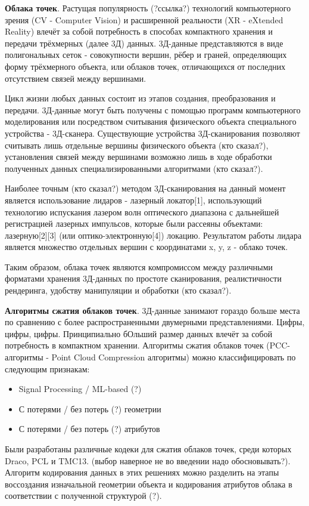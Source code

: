 \textbf{Облака точек}. Растущая популярность (?ссылка?) технологий компьютерного
зрения (CV - Computer Vision) и расширенной реальности (XR - eXtended Reality)
влечёт за собой потребность в способах компактного хранения и передачи
трёхмерных (далее 3Д) данных. 3Д-данные представляются в виде полигональных
сеток - совокупности вершин, рёбер и граней, определяющих форму трёхмерного
объекта, или облаков точек, отличающихся от последних отсутствием связей между
вершинами.

Цикл жизни любых данных состоит из этапов создания, преобразования и передачи.
3Д-данные могут быть получены с помощью программ компьютерного моделирования или
посредством считывания физического объекта специального устройства - 3Д-сканера.
Существующие устройства 3Д-сканирования позволяют считывать лишь отдельные
вершины физического объекта (кто сказал?), установления связей между вершинами
возможно лишь в ходе обработки полученных данных специализированными алгоритмами
(кто сказал?).

Наиболее точным (кто сказал?) методом 3Д-сканирования на данный момент является
использование лидаров - лазерный локатор[1], использующий технологию испускания
лазером волн оптического диапазона с дальнейшей регистрацией лазерных импульсов,
которые были рассеяны объектами: лазерную[2][3] (или оптико-электронную[4])
локацию. Результатом работы лидара является множество отдельных вершин с
координатами x, y, z - облако точек.

Таким образом, облака точек являются компромиссом между различными форматами
хранения 3Д-данных по простоте сканирования, реалистичности рендеринга, удобству
манипуляции и обработки (кто сказал?).

\textbf{Алгоритмы сжатия облаков точек}. 3Д-данные занимают гораздо больше места
по сравнению с более распространенными двумерными представлениями. Цифры, цифры,
цифры. Принципиально бОльший размер данных влечёт за собой потребность в
компактном хранении. Алгоритмы сжатия облаков точек (PCC-алгоритмы - Point Cloud
Compression алгоритмы) можно классифицировать по следующим признакам:

\begin{itemize}
    \item Signal Processing / ML-based (?)
    \item С потерями / без потерь (?) геометрии
    \item С потерями / без потерь (?) атрибутов
\end{itemize}

Были разработаны различные кодеки для сжатия облаков точек, среди которых Draco,
PCL и TMC13. (выбор наверное не во введении надо обосновывать?). Алгоритм
кодирования данных в этих решениях можно разделить на этапы воссоздания
изначальной геометрии объекта и кодирования атрибутов облака в соответствии с
полученной структурой (?).

